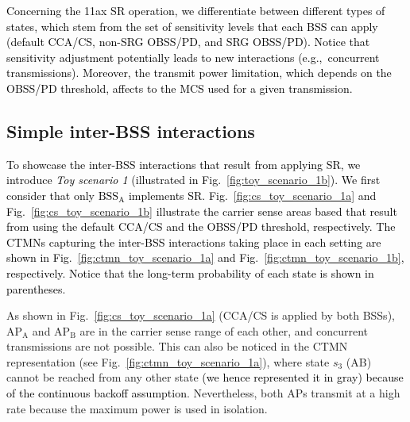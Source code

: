 \documentclass{ieeeaccess}
\begin{document}
\textcolor{black}{Concerning the 11ax SR operation, we differentiate between different types of states, which stem from the set of sensitivity levels that each BSS can apply (default CCA/CS, non-SRG OBSS/PD, and SRG OBSS/PD). Notice that sensitivity adjustment potentially leads to new interactions (e.g.,~concurrent transmissions). Moreover, the transmit power limitation, which depends on the OBSS/PD threshold, affects to the MCS used for a given transmission.}

\subsection{Simple inter-BSS interactions}
\label{section:simple_interactions}
\textcolor{black}{To showcase the inter-BSS interactions that result from applying SR, we introduce \emph{Toy scenario 1} (illustrated in Fig.~\ref{fig:toy_scenario_1b}). We first consider that only $\text{BSS}_\text{A}$ implements SR. Fig.~\ref{fig:cs_toy_scenario_1a} and Fig.~\ref{fig:cs_toy_scenario_1b} illustrate the carrier sense areas based that result from using the default CCA/CS and the OBSS/PD threshold, respectively. The CTMNs capturing the inter-BSS interactions taking place in each setting are shown in Fig.~\ref{fig:ctmn_toy_scenario_1a} and Fig.~\ref{fig:ctmn_toy_scenario_1b}, respectively. Notice that the long-term probability of each state is shown in parentheses.}

As shown in Fig.~\ref{fig:cs_toy_scenario_1a} (CCA/CS is applied by both BSSs), $\text{AP}_\text{A}$ and $\text{AP}_\text{B}$ are in the carrier sense range of each other, and concurrent transmissions are not possible. This can also be noticed in the CTMN representation (see Fig.~\ref{fig:ctmn_toy_scenario_1a}), where state $s_3$ (AB) cannot be reached from any other state \textcolor{black}{(we hence represented it in gray) because of the continuous backoff assumption}. Nevertheless, both APs transmit at a high rate because the maximum power is used in isolation. %
\end{document}
